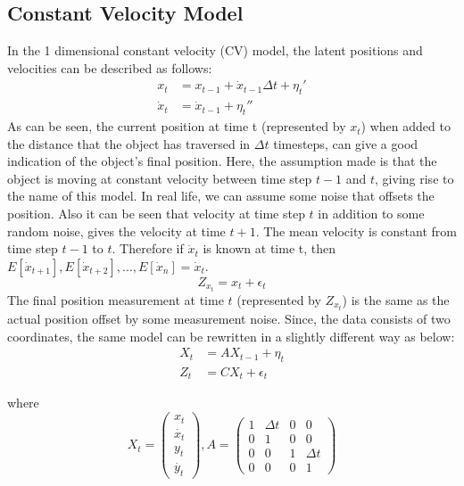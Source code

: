 \documentclass{article}
\begin{document}
\subsection{Constant Velocity Model}
In the 1 dimensional constant velocity (CV) model, the latent positions and velocities can be described as follows:
\begin{equation}\label{eq:13}
\begin{split}
x_t&=x_{t-1}+\dot{x}_{t-1}\Delta t +\eta_t' \\
\dot{x}_{t}&=\dot{x}_{t-1}+\eta_t''
\end{split}
\end{equation}
As can be seen, the current position  at time t (represented by $x_t$) when added to the distance that the object has traversed in $\Delta t$ timesteps, can give a good indication of the object's final position. Here, the assumption made is that the object is moving at constant velocity between time step $t-1$ and $t$, giving rise to the name of this model.  In real life, we can assume some noise that offsets the position. Also it can be seen that velocity at time step $t$ in addition to some random noise, gives the velocity at time $t+1$. The mean velocity is constant from time step $t-1$ to $t$. Therefore if $\dot{x}_t$ is known at time t, then $E[\dot{x}_{t+1}],E[\dot{x}_{t+2}],...,E[\dot{x}_{n}] = \dot{x}_t$. 
\begin{equation}\label{eq:14}
    Z_{x_{t}}=x_{t}+\epsilon_t
\end{equation}
The final position  measurement at time $t$ (represented by $Z_{x_{t}}$) is the same as the actual position offset by some measurement noise. Since, the data consists of two coordinates, the same model can be rewritten in a slightly different way as below:
\begin{equation}\label{eq:15}
    \begin{split}
        X_{t}&=AX_{t-1} + \eta_t\\
        Z_{t}&=CX_{t}+\epsilon_t
    \end{split}
\end{equation}


where $$X_t=\begin{pmatrix}x_t 
\\ \dot{x_t} 
\\ y_t 
\\ \dot{y_t} 
\end{pmatrix}, 
A=\begin{pmatrix}1 & \Delta t & 0 & 0 
\\ 0 & 1 & 0 & 0 
\\ 0 & 0 & 1 &\Delta t
\\ 0 & 0 & 0 & 1 
\end{pmatrix}
$$
\end{document}
